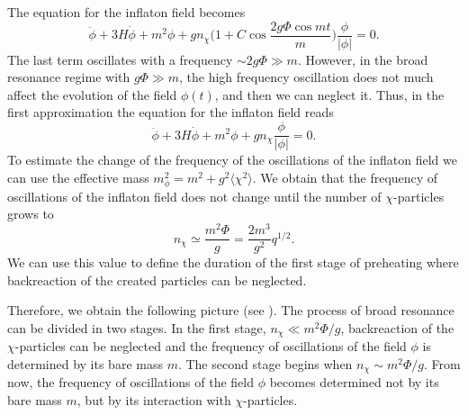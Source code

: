 \documentclass[11pt,a4paper,twoside]{book}
\begin{document}
The equation for the inflaton field becomes
\begin{equation}
\label{Chap4:Backreaction_equationInflaton}
\ddot{\phi} + 3H\dot{\phi} + m^{2}\phi + gn_{\chi}\Bigg(1 + C\cos \frac{2g\Phi 	\cos mt}{m}\Bigg) \frac{\phi}{|\phi|} = 0.
\end{equation}
The last term oscillates with a frequency $\sim 2g\Phi \gg m$. However, in the broad resonance regime with $ g\Phi \gg m $, the high frequency oscillation does not much affect the evolution of the field $ \phi(t) $, and then we can neglect it.
Thus, in the first approximation the equation for the inflaton field reads
\begin{equation}
	\label{Chap4:Backreaction_EquationPhiFinal}
	\ddot{\phi} + 3H\dot{\phi} + m^{2}\phi + gn_{\chi}\frac{\phi}{|\phi|} = 0.
\end{equation}
To estimate the change of the frequency of the oscillations of the inflaton field we can use the effective mass $ m^{2}_{\phi}=m^{2} + g^{2}\langle \chi^{2}\rangle  $. We obtain that the frequency of oscillations of the inflaton field does not change until the number of $ \chi $-particles grows to 
\begin{equation}
\label{Chap4:Backreaction_CriterionFirstStage}
n_{\chi} \simeq \frac{m^{2}\Phi}{g}=\frac{2m^{3}}{g^{2}}q^{1/2}.
\end{equation}
We can use this value to define the duration of the first stage of preheating where  backreaction of the created particles can be neglected. 

Therefore, we obtain the following picture (see \cite{Chap4:LindePreheatingModel}). The process of broad resonance can be divided in two stages. In the first stage, $ n_{\chi} \ll m^{2}\Phi/g $, backreaction of the $ \chi $-particles can be neglected and the frequency of oscillations of the field $ \phi $ is determined by its bare mass $ m $. The second stage begins when $ n_{\chi} \sim m^{2}\Phi/g $. From now, the frequency of oscillations of the field $\phi$ becomes determined not by its bare mass $ m $, but by its interaction with $\chi$-particles.
\end{document}
